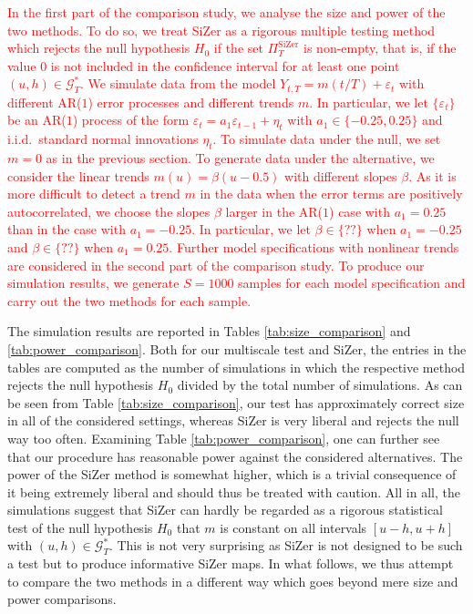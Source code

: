 \textcolor{red}{In the first part of the comparison study, we analyse the size and power of the two methods. To do so, we treat SiZer as a rigorous multiple testing method which rejects the null hypothesis $H_0$ if the set $\Pi_T^{\text{SiZer}}$ is non-empty, that is, if the value $0$ is not included in the confidence interval for at least one point $(u,h) \in \mathcal{G}_T^*$. We simulate data from the model $Y_{t,T} = m(t/T) + \varepsilon_t$ with different AR($1$) error processes and different trends $m$. In particular, we let $\{\varepsilon_t\}$ be an AR($1$) process of the form $\varepsilon_t = a_1 \varepsilon_{t-1} + \eta_t$ with $a_1 \in \{ -0.25,0.25\}$ and i.i.d.\ standard normal innovations $\eta_t$. To simulate data under the null, we set $m = 0$ as in the previous section. To generate data under the alternative, we consider the linear trends $m(u) = \beta (u - 0.5)$ with different slopes $\beta$. As it is more difficult to detect a trend $m$ in the data when the error terms are positively autocorrelated, we choose the slopes $\beta$ larger in the AR($1$) case with $a_1 = 0.25$ than in the case with $a_1 = -0.25$. In particular, we let $\beta \in \{ ?? \}$ when $a_1 = -0.25$ and $\beta \in \{ ?? \}$ when $a_1 = 0.25$. Further model specifications with nonlinear trends are considered in the second part of the comparison study. To produce our simulation results, we generate $S=1000$ samples for each model specification and carry out the two methods for each sample.}



The simulation results are reported in Tables \ref{tab:size_comparison} and \ref{tab:power_comparison}. Both for our multiscale test and SiZer, the entries in the tables are computed as the number of simulations in which the respective method rejects the null hypothesis $H_0$ divided by the total number of simulations. As can be seen from Table \ref{tab:size_comparison}, our test has approximately correct size in all of the considered settings, whereas SiZer is very liberal and rejects the null way too often. Examining Table \ref{tab:power_comparison}, one can further see that our procedure has reasonable power against the considered alternatives. The power of the SiZer method is somewhat higher, which is a trivial consequence of it being extremely liberal and should thus be treated with caution. All in all, the simulations suggest that SiZer can hardly be regarded as a rigorous statistical test of the null hypothesis $H_0$ that $m$ is constant on all intervals $[u-h,u+h]$ with $(u,h) \in \mathcal{G}_T^*$. This is not very surprising as SiZer is not designed to be such a test but to produce informative SiZer maps. In what follows, we thus attempt to compare the two methods in a different way which goes beyond mere size and power comparisons. 


